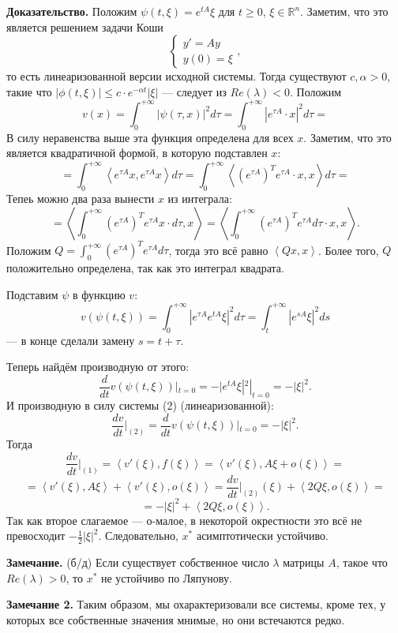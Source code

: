 \textbf{Доказательство.} Положим $\psi(t, \xi) = e^{tA} \xi$ для $t \ge 0$, $\xi \in \mathbb R^n$.
Заметим, что это является решением задачи Коши
\[
    \begin{cases}
        y' = Ay \\
        y(0) = \xi
    \end{cases},
\]
то есть линеаризованной версии исходной системы.
Тогда существуют $c, \alpha > 0$, такие что $|\phi(t, \xi)| \le c \cdot e^{-\alpha t} |\xi|$ --- следует из $Re(\lambda) < 0$.
Положим
\[
    v(x) = \int_0^{+\infty} |\psi(\tau, x)|^2 d\tau = \int_0^{+\infty} |e^{\tau A} \cdot x|^2 d\tau =
\]
В силу неравенства выше эта функция определена для всех $x$.
Заметим, что это является квадратичной формой, в которую подставлен $x$:
\[
    = \int_0^{+\infty} \left< e^{\tau A} x, e^{\tau A} x \right> d\tau = \int_0^{+\infty} \left<(e^{\tau A})^T e^{\tau A} \cdot x, x \right> d\tau =
\]
Тепеь можно два раза вынести $x$ из интеграла:
\[
    = \left< \int_0^{+\infty} (e^{\tau A})^T e^{\tau A} x \cdot d\tau, x \right>
    = \left< \int_0^{+\infty} (e^{\tau A})^T e^{\tau A} d\tau \cdot x, x \right>.
\]
Положим $Q = \int_0^{+\infty} (e^{\tau A})^T e^{\tau A} d\tau$, тогда это всё равно $\left<Qx, x \right>$.
Более того, $Q$ положительно определена, так как это интеграл квадрата.

Подставим $\psi$ в функцию $v$:
\[
    v(\psi(t, \xi)) = \int_0^{+\infty} |e^{\tau A} e^{tA} \xi|^2 d\tau = \int_t^{+\infty} |e^{sA} \xi|^2 ds
\]
--- в конце сделали замену $s = t + \tau$.

Теперь найдём производную от этого:
\[
    \frac{d}{dt} v(\psi(t, \xi))|_{t = 0} = -|e^{tA} \xi|^2 |_{t = 0} = -|\xi|^2.
\]
И производную в силу системы (2) (линеаризованной):
\[
    \frac{dv}{dt} \bigg|_{(2)} = \frac{d}{dt} v(\psi(t, \xi))|_{t = 0} = -|\xi|^2.
\]
Тогда
\[
    \frac{dv}{dt} \bigg|_{(1)} = \left< v'(\xi), f(\xi) \right> = \left<v'(\xi), A \xi + o(\xi) \right> =
\]
\[
    = \left<v'(\xi), A\xi \right> + \left<v'(\xi), o(\xi) \right> = \frac{dv}{dt} \bigg|_{(2)}(\xi) + \left<2Q\xi, o(\xi) \right> =
\]
\[
    = -|\xi|^2 + \left<2Q\xi, o(\xi) \right>.
\]
Так как второе слагаемое --- о-малое, в некоторой окрестности это всё не превосходит $-\frac{1}{2} |\xi|^2$.
Следовательно, $x^*$ асимптотически устойчиво.

\QED

\textbf{Замечание.} (б/д) Если существует собственное число $\lambda$ матрицы $A$, такое что $Re(\lambda) > 0$, то $x^*$ не устойчиво по Ляпунову.

\textbf{Замечание 2.} Таким образом, мы охарактеризовали все системы, кроме тех, у которых все собственные значения мнимые, но они встечаются редко.

